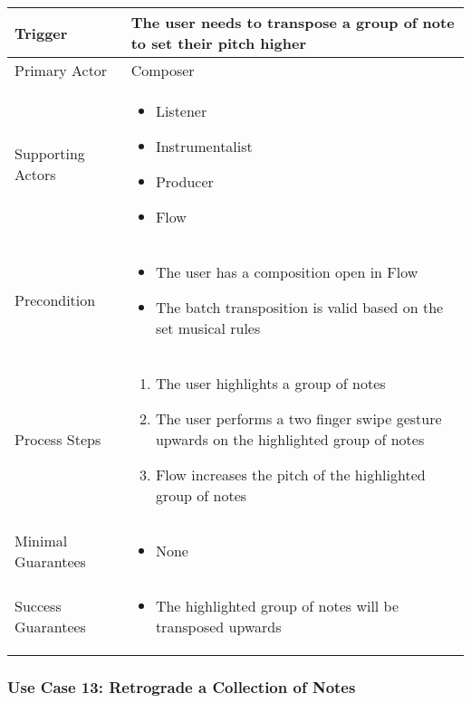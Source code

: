 \begin{tabularx}{\textwidth}{|X|X|}
\hline
Trigger & 
The user needs to transpose a group of note to set their pitch higher \\
\hline
Primary Actor & 
Composer \\
\hline
Supporting Actors & 
\begin{itemize}
\item Listener
\item Instrumentalist
\item Producer
\item Flow
\end{itemize} \\
\hline
Precondition & 
\begin{itemize}
\item The user has a composition open in Flow
\item The batch transposition is valid based on the set musical rules
\end{itemize} \\
\hline
Process Steps & 
\begin{enumerate}
\item The user highlights a group of notes
\item The user performs a two finger swipe gesture upwards on the highlighted group of notes
\item Flow increases the pitch of the highlighted group of notes
\end{enumerate} \\
\hline
Minimal Guarantees & 
\begin{itemize}
  \item None
\end{itemize} \\
\hline
Success Guarantees & 
\begin{itemize}
  \item The highlighted group of notes will be transposed upwards
\end{itemize} \\
\hline
\end{tabularx}


\subsubsection{Use Case 13: Retrograde a Collection of Notes}

